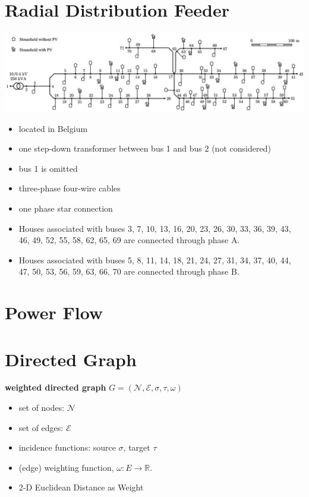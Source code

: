\documentclass[
]{book}
\providecommand{\tightlist}{%
  \setlength{\itemsep}{0pt}\setlength{\parskip}{0pt}}
\begin{document}
\hypertarget{RDF}{%
\chapter{Radial Distribution Feeder}\label{RDF}}

\includegraphics{../Pictures/case70true.png}

\begin{itemize}
\tightlist
\item
  located in Belgium
\item
  one step-down transformer between bus 1 and bus 2 (not considered)
\item
  bus 1 is omitted
\item
  three-phase four-wire cables
\item
  one phase star connection
\item
  Houses associated with buses 3, 7, 10, 13, 16, 20, 23, 26, 30, 33, 36, 39,
  43, 46, 49, 52, 55, 58, 62, 65, 69 are connected through phase A.
\item
  Houses associated with buses 5, 8, 11, 14, 18, 21, 24, 27, 31, 34, 37, 40,
  44, 47, 50, 53, 56, 59, 63, 66, 70 are connected through phase B.
\end{itemize}

\hypertarget{power-flow}{%
\chapter{Power Flow}\label{power-flow}}

\hypertarget{directed-graph}{%
\chapter{Directed Graph}\label{directed-graph}}

\textbf{weighted directed graph}
\(G = (\mathcal{N}, \mathcal{E}, \sigma, \tau, \omega)\)

\begin{itemize}
\tightlist
\item
  set of nodes: \(\mathcal{N}\)
\item
  set of edges: \(\mathcal{E}\)
\item
  incidence functions: source \(\sigma\), target \(\tau\)
\item
  (edge) weighting function, \(\omega: E \rightarrow \mathbb{R}\).
\item
  2-D Euclidean Distance as Weight
\end{itemize}
\end{document}
